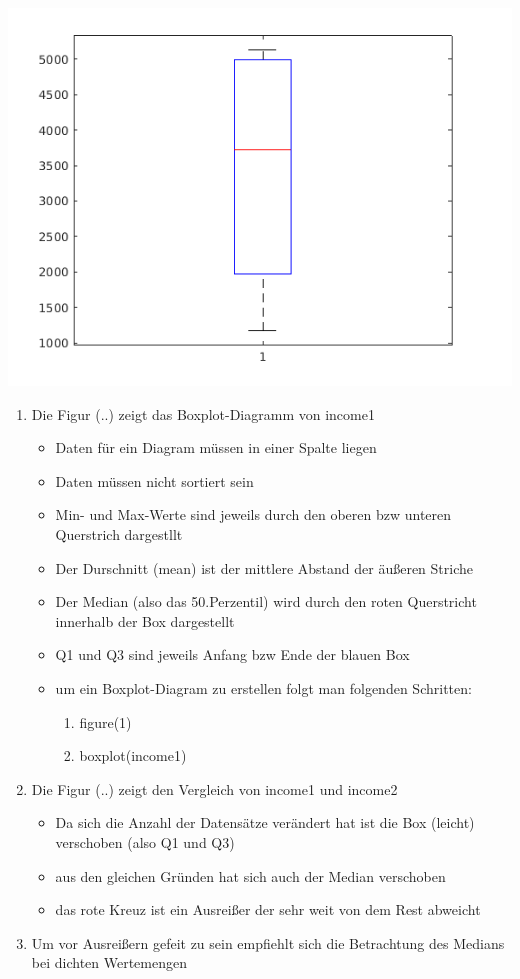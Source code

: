 \includegraphics{Graphik/income1}
\begin{enumerate}
	\item Die Figur (..) zeigt das Boxplot-Diagramm von income1 
	\begin{itemize}
		\item Daten für ein Diagram müssen in einer Spalte liegen
		\item Daten müssen nicht sortiert sein
		\item Min- und Max-Werte sind jeweils durch den oberen bzw unteren Querstrich dargestllt
		\item Der Durschnitt (mean) ist der mittlere Abstand der äußeren  Striche
		\item Der Median (also das 50.Perzentil) wird durch den roten Querstricht innerhalb der Box dargestellt
		\item Q1 und Q3 sind jeweils Anfang bzw Ende der blauen Box
		\item um ein Boxplot-Diagram zu erstellen folgt man folgenden Schritten:
		\begin{enumerate}
			\item figure(1)
			\item boxplot(income1)
		\end{enumerate}
	\end{itemize}
	\item Die Figur (..) zeigt den Vergleich von income1 und income2
	\begin{itemize}
		\item Da sich die Anzahl der Datensätze verändert hat ist die Box (leicht) verschoben (also Q1 und Q3)
		\item aus den gleichen Gründen hat sich auch der Median verschoben 
		\item das rote Kreuz ist ein Ausreißer der sehr weit von dem Rest abweicht
	\end{itemize}
	\item Um vor Ausreißern gefeit zu sein empfiehlt sich die Betrachtung des Medians bei dichten Wertemengen
\end{enumerate}

